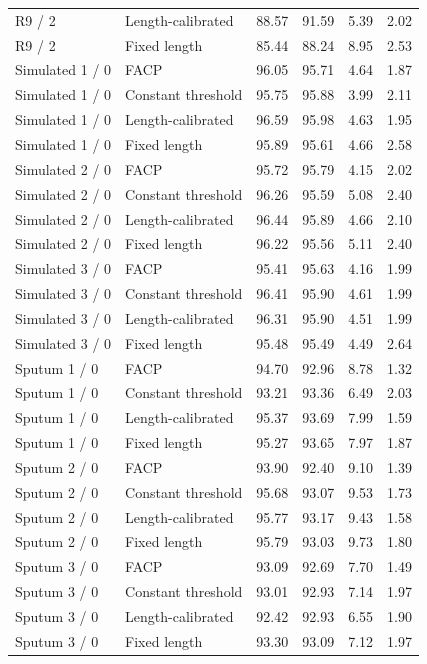 \begin{longtable}{llllll}
R9 / 2 & Length-calibrated & 88.57 & 91.59 & 5.39 & 2.02\\
R9 / 2 & Fixed length & 85.44 & 88.24 & 8.95 & 2.53\\
Simulated 1 / 0 & FACP & 96.05 & 95.71 & 4.64 & 1.87\\
Simulated 1 / 0 & Constant threshold & 95.75 & 95.88 & 3.99 & 2.11\\
Simulated 1 / 0 & Length-calibrated & 96.59 & 95.98 & 4.63 & 1.95\\
Simulated 1 / 0 & Fixed length & 95.89 & 95.61 & 4.66 & 2.58\\
Simulated 2 / 0 & FACP & 95.72 & 95.79 & 4.15 & 2.02\\
Simulated 2 / 0 & Constant threshold & 96.26 & 95.59 & 5.08 & 2.40\\
Simulated 2 / 0 & Length-calibrated & 96.44 & 95.89 & 4.66 & 2.10\\
Simulated 2 / 0 & Fixed length & 96.22 & 95.56 & 5.11 & 2.40\\
Simulated 3 / 0 & FACP & 95.41 & 95.63 & 4.16 & 1.99\\
Simulated 3 / 0 & Constant threshold & 96.41 & 95.90 & 4.61 & 1.99\\
Simulated 3 / 0 & Length-calibrated & 96.31 & 95.90 & 4.51 & 1.99\\
Simulated 3 / 0 & Fixed length & 95.48 & 95.49 & 4.49 & 2.64\\
Sputum 1 / 0 & FACP & 94.70 & 92.96 & 8.78 & 1.32\\
Sputum 1 / 0 & Constant threshold & 93.21 & 93.36 & 6.49 & 2.03\\
Sputum 1 / 0 & Length-calibrated & 95.37 & 93.69 & 7.99 & 1.59\\
Sputum 1 / 0 & Fixed length & 95.27 & 93.65 & 7.97 & 1.87\\
Sputum 2 / 0 & FACP & 93.90 & 92.40 & 9.10 & 1.39\\
Sputum 2 / 0 & Constant threshold & 95.68 & 93.07 & 9.53 & 1.73\\
Sputum 2 / 0 & Length-calibrated & 95.77 & 93.17 & 9.43 & 1.58\\
Sputum 2 / 0 & Fixed length & 95.79 & 93.03 & 9.73 & 1.80\\
Sputum 3 / 0 & FACP & 93.09 & 92.69 & 7.70 & 1.49\\
Sputum 3 / 0 & Constant threshold & 93.01 & 92.93 & 7.14 & 1.97\\
Sputum 3 / 0 & Length-calibrated & 92.42 & 92.93 & 6.55 & 1.90\\
Sputum 3 / 0 & Fixed length & 93.30 & 93.09 & 7.12 & 1.97\\
\end{longtable}
